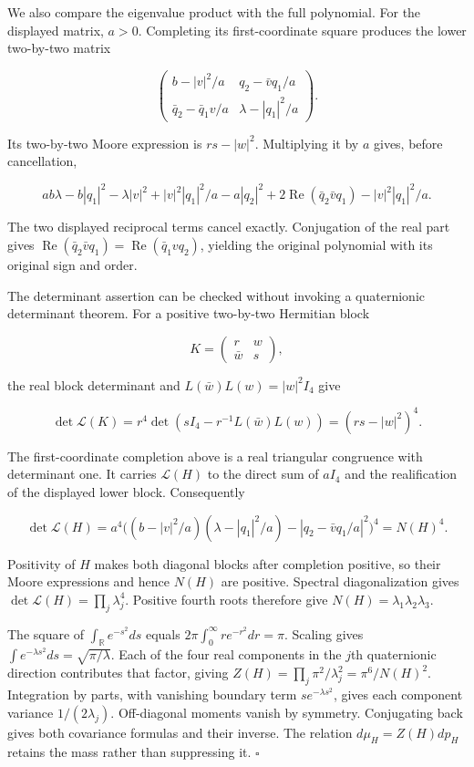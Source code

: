 \documentclass[
  11pt,
]{article}
\begin{document}
We also compare the eigenvalue product with the full polynomial. For the
displayed matrix, \(a>0\). Completing its first-coordinate square
produces the lower two-by-two matrix

\[
\begin{pmatrix}
b-|v|^2/a&q_2-\bar vq_1/a\\
\bar q_2-\bar q_1v/a&\lambda-|q_1|^2/a
\end{pmatrix}.
\]

Its two-by-two Moore expression is \(rs-|w|^2\). Multiplying it by \(a\)
gives, before cancellation,

\[
ab\lambda-b|q_1|^2-\lambda|v|^2
+|v|^2|q_1|^2/a
-a|q_2|^2+2\operatorname{Re}(\bar q_2\bar vq_1)
-|v|^2|q_1|^2/a.
\]

The two displayed reciprocal terms cancel exactly. Conjugation of the
real part gives
\(\operatorname{Re}(\bar q_2\bar vq_1)=\operatorname{Re}(\bar q_1vq_2)\),
yielding the original polynomial with its original sign and order.

The determinant assertion can be checked without invoking a quaternionic
determinant theorem. For a positive two-by-two Hermitian block

\[
K=\begin{pmatrix}r&w\\ \bar w&s\end{pmatrix},
\]

the real block determinant and \(L(\bar w)L(w)=|w|^2I_4\) give

\[
\det\mathscr L(K)
=r^4\det\!\left(sI_4-r^{-1}L(\bar w)L(w)\right)
=(rs-|w|^2)^4.
\]

The first-coordinate completion above is a real triangular congruence
with determinant one. It carries \(\mathscr L(H)\) to the direct sum of
\(aI_4\) and the realification of the displayed lower block.
Consequently

\[
\det\mathscr L(H)
=a^4\bigl((b-|v|^2/a)(\lambda-|q_1|^2/a)
-|q_2-\bar vq_1/a|^2\bigr)^4
=N(H)^4.
\]

Positivity of \(H\) makes both diagonal blocks after completion
positive, so their Moore expressions and hence \(N(H)\) are positive.
Spectral diagonalization gives \(\det\mathscr L(H)=\prod_j\lambda_j^4\).
Positive fourth roots therefore give
\(N(H)=\lambda_1\lambda_2\lambda_3\).

The square of \(\int_{\mathbb R}e^{-s^2}ds\) equals
\(2\pi\int_0^\infty re^{-r^2}dr=\pi\). Scaling gives
\(\int e^{-\lambda s^2}ds=\sqrt{\pi/\lambda}\). Each of the four real
components in the \(j\)th quaternionic direction contributes that
factor, giving \(Z(H)=\prod_j\pi^2/\lambda_j^2=\pi^6/N(H)^2\).
Integration by parts, with vanishing boundary term
\(se^{-\lambda s^2}\), gives each component variance \(1/(2\lambda_j)\).
Off-diagonal moments vanish by symmetry. Conjugating back gives both
covariance formulas and their inverse. The relation \(d\mu_H=Z(H)dp_H\)
retains the mass rather than suppressing it. \ensuremath{\square}
\end{document}
